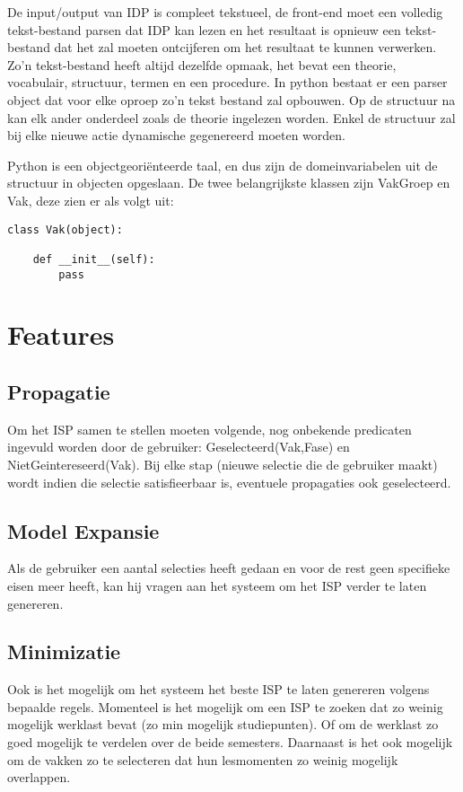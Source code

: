 De input/output van IDP is compleet tekstueel, de front-end moet een volledig tekst-bestand parsen dat IDP kan lezen en het resultaat is opnieuw een tekst-bestand dat het zal moeten ontcijferen om het resultaat te kunnen verwerken. 
Zo'n tekst-bestand heeft altijd dezelfde opmaak, het bevat een theorie, vocabulair, structuur, termen en een procedure. In python bestaat er een parser object dat voor elke oproep zo'n tekst bestand zal opbouwen. Op de structuur na kan elk ander onderdeel zoals de theorie ingelezen worden. Enkel de structuur zal bij elke nieuwe actie dynamische gegenereerd moeten worden. 

Python is een objectgeori\"{e}nteerde taal, en dus zijn de domeinvariabelen uit de structuur in objecten opgeslaan. De twee belangrijkste klassen zijn VakGroep en Vak, deze zien er als volgt uit: 

\lstset{language=Python}
\begin{lstlisting}
class Vak(object):

	def __init__(self):
		pass
\end{lstlisting}

\section{Features}

\subsection{Propagatie}
Om het ISP samen te stellen moeten volgende, nog onbekende predicaten ingevuld worden door de gebruiker: Geselecteerd(Vak,Fase) en NietGeintereseerd(Vak). Bij elke stap (nieuwe selectie die de gebruiker maakt) wordt indien die selectie satisfieerbaar is, eventuele propagaties ook geselecteerd. 

\subsection{Model Expansie}
Als de gebruiker een aantal selecties heeft gedaan en voor de rest geen specifieke eisen meer heeft, kan hij vragen aan het systeem om het ISP verder te laten genereren. 

\subsection{Minimizatie}
Ook is het mogelijk om het systeem het beste ISP te laten genereren volgens bepaalde regels. Momenteel is het mogelijk om een ISP te zoeken dat zo weinig mogelijk werklast bevat (zo min mogelijk studiepunten). Of om de werklast zo goed mogelijk te verdelen over de beide semesters. 
Daarnaast is het ook mogelijk om de vakken zo te selecteren dat hun lesmomenten zo weinig mogelijk overlappen. 

